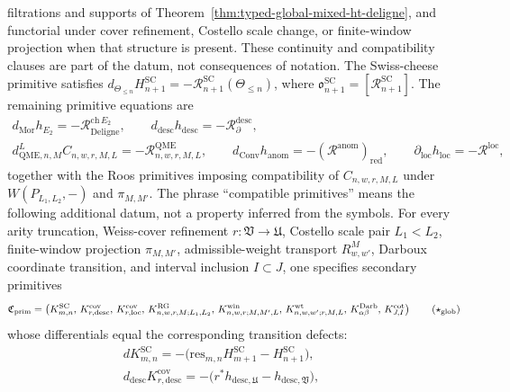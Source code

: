 \begin{defn}
  filtrations and supports of
  Theorem~\ref{thm:typed-global-mixed-ht-deligne}, and functorial under
  cover refinement, Costello scale change, or finite-window projection
  when that structure is present.  These continuity and compatibility
  clauses are part of the datum, not consequences of notation.
	  The Swiss-cheese primitive satisfies
	  \(d_{\Theta_{\le n}}H^{\mathrm{SC}}_{n+1}
	  =-\mathcal R^{\mathrm{SC}}_{n+1}(\Theta_{\le n})\), where
	  \(\mathfrak o^{\mathrm{SC}}_{n+1}
	  =[\mathcal R^{\mathrm{SC}}_{n+1}]\).  The remaining primitive
	  equations are
	  \[
	  \begin{gathered}
	    d_{\mathrm{Mor}}h_{E_2}
	    =-\mathcal R^{\mathrm{ch}\,E_2}_{\mathrm{Deligne}},\qquad
	    d_{\mathrm{desc}}h_{\mathrm{desc}}
	    =-\mathcal R^{\mathrm{desc}}_{\partial},\\
	    d^{L}_{\mathrm{QME},n,M}C_{n,w,r,M,L}
	    =-\mathcal R^{\mathrm{QME}}_{n,w,r,M,L},\qquad
	    d_{\mathrm{Conv}}h_{\mathrm{anom}}
	    =-(\mathcal R^{\mathrm{anom}})_{\mathrm{red}},\qquad
	    \partial_{\mathrm{loc}}h_{\mathrm{loc}}
	    =-\mathcal R^{\mathrm{loc}},
	  \end{gathered}
	  \]
	  together with the Roos primitives imposing compatibility of
		  \(C_{n,w,r,M,L}\) under \(W(P_{L_1,L_2},-)\) and \(\pi_{M,M'}\).
  The phrase ``compatible primitives'' means the following additional
  datum, not a property inferred from the symbols.  For every arity
  truncation, Weiss-cover refinement \(r:\mathfrak V\to\mathfrak U\),
  Costello scale pair \(L_1<L_2\), finite-window projection
  \(\pi_{M,M'}\), admissible-weight transport \(R^M_{w,w'}\), Darboux
  coordinate transition, and interval inclusion \(I\subset J\), one
  specifies secondary primitives
  \[
  \mathfrak C_{\mathrm{prim}}
  =
  \left(
    K^{\mathrm{SC}}_{m,n},\,
    K^{\mathrm{cov}}_{r,\mathrm{desc}},\,
    K^{\mathrm{cov}}_{r,\mathrm{loc}},\,
	    K^{\mathrm{RG}}_{n,w,r,M;L_1,L_2},\,
	    K^{\mathrm{win}}_{n,w,r;M,M',L},\,
	    K^{\mathrm{wt}}_{n,w,w';r,M,L},\,
    K^{\mathrm{Darb}}_{\alpha\beta},\,
    K^{\mathrm{cot}}_{J,I}
  \right)
  \tag{\(\star_{\mathrm{glob}}\)}
  \label{eq:global-primitive-compatibility-datum}
  \]
  whose differentials equal the corresponding transition defects:
  \[
  \begin{gathered}
    dK^{\mathrm{SC}}_{m,n}
    =-\bigl(\mathrm{res}_{m,n}H^{\mathrm{SC}}_{m+1}
      -H^{\mathrm{SC}}_{n+1}\bigr),\\
    d_{\mathrm{desc}}K^{\mathrm{cov}}_{r,\mathrm{desc}}
    =-\bigl(r^*h_{\mathrm{desc},\mathfrak U}
      -h_{\mathrm{desc},\mathfrak V}\bigr),\qquad

\end{gathered}\]
\end{defn}
